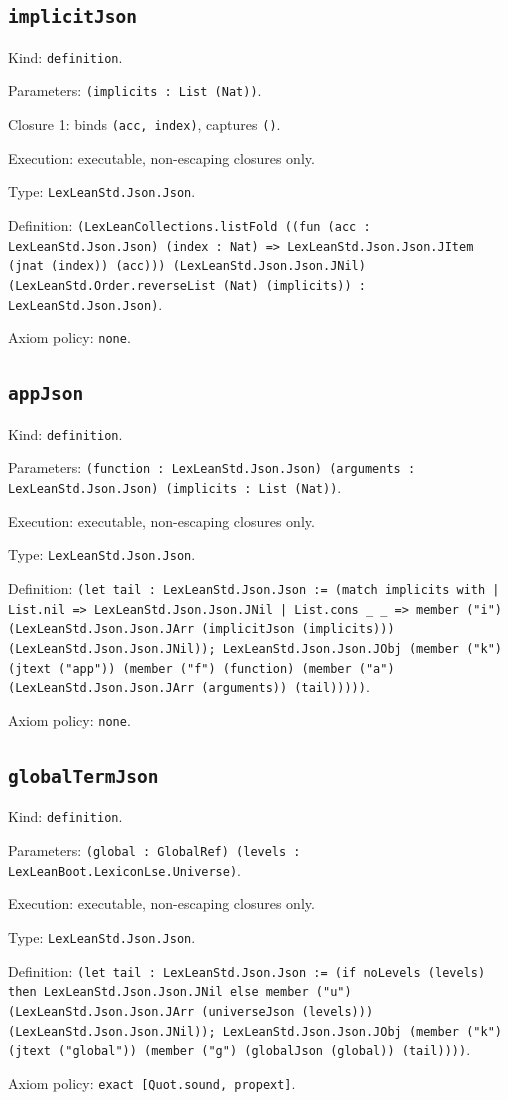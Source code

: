 \documentclass[11pt]{article}
\begin{document}
\subsection*{\texttt{implicitJson}}
\noindent Kind: \texttt{definition}.\par
\noindent Parameters: \texttt{(implicits : List (Nat))}.\par
\noindent Closure 1: binds \texttt{(acc, index)}, captures \texttt{()}.\par
\noindent Execution: executable, non-escaping closures only.\par
\noindent Type: \texttt{LexLeanStd.Json.Json}.\par
\noindent Definition: \texttt{(LexLeanCollections.listFold ((fun (acc : LexLeanStd.Json.Json) (index : Nat) => LexLeanStd.Json.Json.JItem (jnat (index)) (acc))) (LexLeanStd.Json.Json.JNil) (LexLeanStd.Order.reverseList (Nat) (implicits)) : LexLeanStd.Json.Json)}.\par
\noindent Axiom policy: \texttt{none}.\par
\subsection*{\texttt{appJson}}
\noindent Kind: \texttt{definition}.\par
\noindent Parameters: \texttt{(function : LexLeanStd.Json.Json) (arguments : LexLeanStd.Json.Json) (implicits : List (Nat))}.\par
\noindent Execution: executable, non-escaping closures only.\par
\noindent Type: \texttt{LexLeanStd.Json.Json}.\par
\noindent Definition: \texttt{(let tail : LexLeanStd.Json.Json := (match implicits with | List.nil => LexLeanStd.Json.Json.JNil | List.cons \_ \_ => member ("i") (LexLeanStd.Json.Json.JArr (implicitJson (implicits))) (LexLeanStd.Json.Json.JNil)); LexLeanStd.Json.Json.JObj (member ("k") (jtext ("app")) (member ("f") (function) (member ("a") (LexLeanStd.Json.Json.JArr (arguments)) (tail)))))}.\par
\noindent Axiom policy: \texttt{none}.\par
\subsection*{\texttt{globalTermJson}}
\noindent Kind: \texttt{definition}.\par
\noindent Parameters: \texttt{(global : GlobalRef) (levels : LexLeanBoot.LexiconLse.Universe)}.\par
\noindent Execution: executable, non-escaping closures only.\par
\noindent Type: \texttt{LexLeanStd.Json.Json}.\par
\noindent Definition: \texttt{(let tail : LexLeanStd.Json.Json := (if noLevels (levels) then LexLeanStd.Json.Json.JNil else member ("u") (LexLeanStd.Json.Json.JArr (universeJson (levels))) (LexLeanStd.Json.Json.JNil)); LexLeanStd.Json.Json.JObj (member ("k") (jtext ("global")) (member ("g") (globalJson (global)) (tail))))}.\par
\noindent Axiom policy: \texttt{exact [Quot.sound, propext]}.\par
\end{document}
